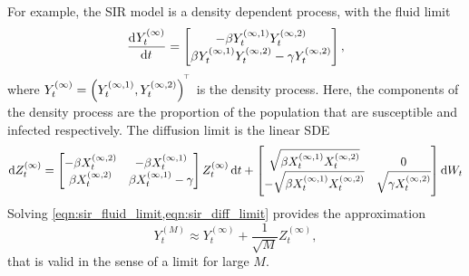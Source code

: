 For example, the SIR model is a density dependent process, with the fluid limit
\begin{equation}
	\dod{Y_t^{(\infty)}}{t} = \begin{bmatrix}
		-\beta Y_t^{(\infty,1)} Y_t^{(\infty, 2)} \\
		\beta Y_t^{(\infty,1)} Y_t^{(\infty, 2)} -\gamma Y_t^{(\infty, 2)}
	\end{bmatrix},
	\label{eqn:sir_fluid_limit}
\end{equation}
where \(Y_t^{(\infty)} = \left(Y_t^{(\infty, 1)},Y_t^{(\infty, 2)}\right)^{^{\!\top}}\) is the density process.
Here, the components of the density process are the proportion of the population that are susceptible and infected respectively.
The diffusion limit is the linear SDE
\begin{equation}
	\dif Z_t^{(\infty)} = \begin{bmatrix}
		-\beta X_t^{(\infty, 2)} & -\beta X_t^{(\infty, 1)}         \\
		\beta X_t^{(\infty, 2)}  & \beta X_t^{(\infty, 1)} - \gamma
	\end{bmatrix} Z_t^{(\infty)}\dif t +  \begin{bmatrix}
		\sqrt{\beta X_t^{(\infty, 1)} X_t^{(\infty, 2)}}  & 0                               \\
		-\sqrt{\beta X_t^{(\infty, 1)} X_t^{(\infty, 2)}} & \sqrt{\gamma X_t^{(\infty, 2)}}
	\end{bmatrix}\dif W_t
	\label{eqn:sir_diff_limit}
\end{equation}
Solving \cref{eqn:sir_fluid_limit,eqn:sir_diff_limit} provides the approximation
\[
	Y_t^{(M)} \approx Y_t^{(\infty)} + \frac{1}{\sqrt{M}} Z_t^{(\infty)},
\]
that is valid in the sense of a limit for large \(M\).

